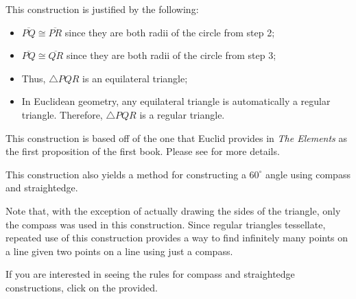 \documentclass[12pt]{article}
\begin{document}
This construction is justified by the following:

\begin{itemize}
\item $\overline{PQ}\cong\overline{PR}$ since they are both radii of the circle from step 2;
\item $\overline{PQ}\cong\overline{QR}$ since they are both radii of the circle from step 3;
\item Thus, $\triangle PQR$ is an equilateral triangle;
\item In Euclidean geometry, any equilateral triangle is automatically a regular triangle.  Therefore, $\triangle PQR$ is a regular triangle.
\end{itemize}

This construction is based off of the one that Euclid provides in \emph{The Elements} as the first proposition of the first book.  Please see  for more details.

This construction also yields a method for constructing a $60^{\circ}$ angle using compass and straightedge.

Note that, with the exception of actually drawing the sides of the triangle, only the compass was used in this construction.  Since regular triangles tessellate, repeated use of this construction provides a way to find infinitely many points on a line given two points on a line using just a compass.

If you are interested in seeing the rules for compass and straightedge constructions, click on the  provided.
\end{document}
